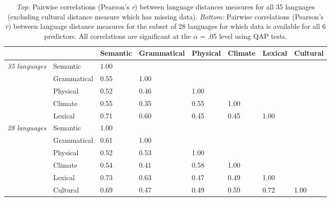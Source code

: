 \documentclass[9pt,twoside,lineno]{pnas-new}
\begin{document}

\begin{table}[h]
\centering
\begin{tabular}{llp{1.5cm}p{1.8cm}p{1.3cm}p{1.3cm}p{1.3cm}p{1.3cm}}

  & &  Semantic   &  Grammatical   &  Physical   &  Climate  &  Lexical    &  Cultural  \\ 
  \hline
    \hline
{\it 35 languages} & Semantic  & 1.00 & & &  & \\ 
& Grammatical  & 0.55 & 1.00 &  & & \\ 
& Physical  & 0.52 & 0.46 & 1.00 &  & \\ 
& Climate  & 0.55 & 0.35 & 0.55 & 1.00 & \\ 
& Lexical  & 0.71 & 0.60 & 0.45 & 0.45 & 1.00 \\ 
   \hline
{\it 28 languages} &   Semantic  & 1.00 &  &  & &  & \\ 
 &Grammatical  & 0.61 & 1.00 &  &&  & \\ 
&Physical  & 0.52 & 0.53 & 1.00 & & &\\ 
& Climate  & 0.54 & 0.41 & 0.58 & 1.00  &  &\\ 
&  Lexical  & 0.73 & 0.63 & 0.47 & 0.49& 1.00 & \\
&    Cultural  & 0.69 & 0.47 & 0.49 & 0.59 & 0.72  & 1.00\\ 
      \hline
        \hline
\end{tabular}
   \caption{ {\it Top:} Pairwise correlations (Pearson's {\it r}) between language distances measures for all 35 languages (excluding cultural distance measure which has  missing data). {\it Bottom:} Pairwise correlations (Pearson's {\it r}) between language distance measures for the subset of 28 languages for which data is available for all 6 predictors. All correlations are significant at the $\alpha$ = .05 level using QAP tests.} 
\end{table}

\pagebreak
 \clearpage

 

 


\FloatBarrier





\pagebreak
 \clearpage
 

\end{document}
